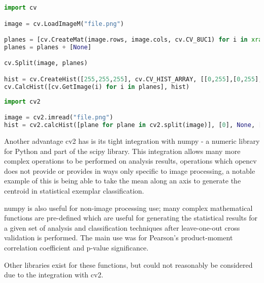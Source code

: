 \begin{lstlisting}[language=python, caption={Creating a Histogram in OpenCV}, label=lst:cv1-hist, 
breaklines=true, frame=single]
import cv

image = cv.LoadImageM("file.png")

planes = [cv.CreateMat(image.rows, image.cols, cv.CV_8UC1) for i in xrange(3)]
planes = planes + [None]

cv.Split(image, planes)

hist = cv.CreateHist([255,255,255], cv.CV_HIST_ARRAY, [[0,255],[0,255],[0,255]], 1)
cv.CalcHist([cv.GetImage(i) for i in planes], hist)
\end{lstlisting}


\begin{lstlisting}[language=python, caption={Creating a Histogram in OpenCV cv2},
label=lst:cv2-hist, breaklines=true, frame=single]
import cv2

image = cv2.imread("file.png")
hist = cv2.calcHist([plane for plane in cv2.split(image)], [0], None, [255,255,255], [0,255,0,255,0,255])
\end{lstlisting}

Another advantage \gls{cv2} has is its tight integration with numpy - a numeric library for Python
and part of the scipy library. This integration allows many more complex operations to be 
performed on analysis results, operations which \gls{opencv} does not provide or provides in ways
only specific to image processing, a notable example of this is being able to take the mean along
an axis to generate the centroid in statistical exemplar classification.

numpy is also useful for non-image processing use; many complex mathematical functions are 
pre-defined which are useful for generating the statistical results for a given set of analysis
and classification techniques after leave-one-out cross validation is performed. The main use was
for Pearson's product-moment correlation coefficient and p-value significance.

Other libraries exist for these functions, but could not reasonably be considered due to the 
integration with \gls{cv2}.
